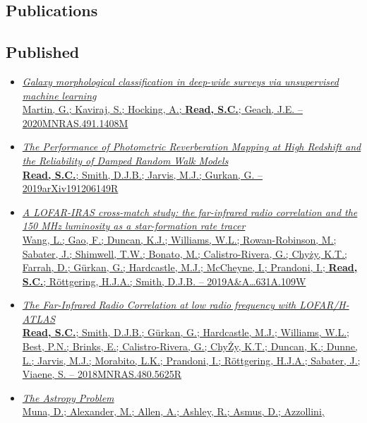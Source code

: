 \documentclass[letterpaper]{twentysecondcv} %
\begin{document}
\begin{finalpages}
\section{Publications}
\subsection{Published}
\begin{itemize}
     \item \href{http://shaun.science/publication/2020-01-00-Galaxy-morphological-classification-in-deep-wide-surveys-via-unsupervised-machine-learning}{\textit{Galaxy morphological classification in deep-wide surveys via
unsupervised machine learning}\\{\small Martin, G.; Kaviraj, S.; Hocking, A.; \textbf{Read, S.C.}; Geach, J.E. -- 2020MNRAS.491.1408M}}
 \item \href{http://shaun.science/publication/2019-12-00-The-Performance-of-Photometric-Reverberation-Mapping-at-High-Redshift-and-the-Reliability-of-Damped-Random-Walk-Models}{\textit{The Performance of Photometric Reverberation Mapping at High Redshift
and the Reliability of Damped Random Walk Models}\\{\small \textbf{Read, S.C.}; Smith, D.J.B.; Jarvis, M.J.; Gurkan, G. -- 2019arXiv191206149R}}
 \item \href{http://shaun.science/publication/2019-11-00-A-LOFAR-IRAS-cross-match-study}{\textit{A LOFAR-IRAS cross-match study: the far-infrared radio correlation and
the 150 MHz luminosity as a star-formation rate tracer}\\{\small Wang, L.; Gao, F.; Duncan, K.J.; Williams, W.L.; Rowan-Robinson, M.;
Sabater, J.; Shimwell, T.W.; Bonato, M.; Calistro-Rivera, G.; Chyży,
K.T.; Farrah, D.; Gürkan, G.; Hardcastle, M.J.; McCheyne, I.; Prandoni,
I.; \textbf{Read, S.C.}; Röttgering, H.J.A.; Smith, D.J.B. -- 2019A\&A\ldots631A.109W}}
 \item \href{http://shaun.science/publication/2018-11-00-The-Far-Infrared-Radio-Correlation-at-low-radio-frequency-with-LOFAR-H-ATLAS}{\textit{The Far-Infrared Radio Correlation at low radio frequency with
LOFAR/H-ATLAS}\\{\small \textbf{Read, S.C.}; Smith, D.J.B.; Gürkan, G.; Hardcastle, M.J.;
Williams, W.L.; Best, P.N.; Brinks, E.; Calistro-Rivera, G.; ChyŻy,
K.T.; Duncan, K.; Dunne, L.; Jarvis, M.J.; Morabito, L.K.; Prandoni, I.;
Röttgering, H.J.A.; Sabater, J.; Viaene, S. -- 2018MNRAS.480.5625R}}
 \item \href{http://shaun.science/publication/2016-10-00-The-Astropy-Problem}{\textit{The Astropy Problem}\\{\small Muna, D.; Alexander, M.; Allen, A.; Ashley, R.; Asmus, D.; Azzollini,
}}
\end{itemize}
\end{finalpages}
\end{document}
